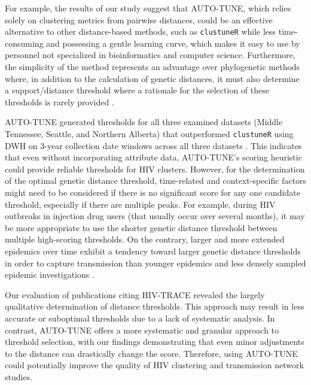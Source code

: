 \documentclass[utf8]{FrontiersinHarvard} %
\newcommand{\TODO}[1]{{\color{red}{#1}}}
\begin{document}
For example, the results of our study suggest that AUTO-TUNE, which relies
solely on clustering metrics from pairwise distances, could be an effective
alternative to other distance-based methods, such as {\tt clustuneR} while less
time-consuming and possessing a gentle learning curve, which makes it easy to
use by personnel not specialized in bioinformatics and computer science.
Furthermore, the simplicity of the method represents an advantage over
phylogenetic methods where, in addition to the calculation of genetic
distances, it must also determine a support/distance threshold where a
rationale for the selection of these thresholds is rarely provided
\citep{junqueira_factors_2019}.

AUTO-TUNE generated thresholds for all three examined datasets (Middle
Tennessee, Seattle, and Northern Alberta) that outperformed {\tt clustuneR}
using DWH on 3-year collection date windows across all three datasets
\TODO{again, need to be clear about why higher DWH is better}. This indicates
that even without incorporating attribute data, AUTO-TUNE's scoring heuristic
could provide reliable thresholds for HIV clusters. However, for the
determination of the optimal genetic distance threshold, time-related and
context-specific factors might need to be considered if there is no significant
score for any one candidate threshold, especially if there are multiple peaks.
For example, during HIV outbreaks in injection drug users (that usually occur
over several months), it may be more appropriate to use the shorter genetic
distance threshold \citep{peters_hiv_2016,campbell_detailed_2017} between
multiple high-scoring thresholds. On the contrary, larger and more extended
epidemics over time exhibit a tendency toward larger genetic distance
thresholds in order to capture transmission than younger epidemics and less
densely sampled epidemic investigations
\citep{patil_exploring_2022,leung_molecular_2019,di_giallonardo_subtype-specific_2021}.

Our evaluation of publications citing HIV-TRACE revealed the largely
qualitative determination of distance thresholds. This approach may result in
less accurate or suboptimal thresholds due to a lack of systematic analysis. In
contrast, AUTO-TUNE offers a more systematic and granular approach to threshold
selection, with our findings demonstrating that even minor adjustments to the
distance can drastically change the score. Therefore, using AUTO-TUNE could
potentially improve the quality of HIV clustering and transmission network
studies.
\end{document}
